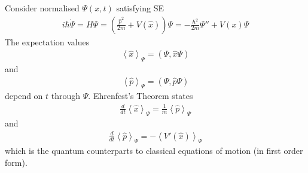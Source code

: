 \documentclass[a4paper]{article}
\begin{document}
Consider normalised $\Psi\left(x,t\right)$ satisfying SE
\begin{equation*}
\begin{aligned}
i\hbar\dot{\Psi} = H\Psi = \left(\frac{\hat{p}^2}{2m} + V\left(\hat{x}\right)\right)\Psi = -\frac{\hbar^2}{2m}\Psi'' + V\left(x\right) \Psi
\end{aligned}
\end{equation*}
The expectation values
\begin{equation*}
\begin{aligned}
\left<\hat{x}\right>_\Psi = \left(\Psi,\hat{x}\Psi\right)
\end{aligned}
\end{equation*}
and
\begin{equation*}
\begin{aligned}
\left<\hat{p}\right>_\Psi = \left(\Psi,\hat{p}\Psi\right)
\end{aligned}
\end{equation*}
depend on $t$ through $\Psi$. Ehrenfest's Theorem states
\begin{equation*}
\begin{aligned}
\frac{d}{dt}\left<\hat{x}\right>_\Psi = \frac{1}{m} \left<\hat{p}\right>_\Psi
\end{aligned}
\end{equation*}
and
\begin{equation*}
\begin{aligned}
\frac{d}{dt}\left<\hat{p}\right>_\Psi = -\left<V'\left(\hat{x}\right)\right>_\Psi
\end{aligned}
\end{equation*}
which is the quantum counterparts to classical equations of motion (in first order form).
\end{document}
